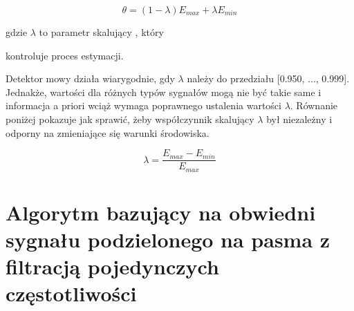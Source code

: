 \documentclass[eng,printmode]{mgr}
\begin{document}
  \begin{equation}
	  \theta = (1-\lambda)E_{max} + \lambda E_{min}
  \end{equation}
  
  \hspace{8cm}gdzie $\lambda$ to parametr skalujący , który 
  
  \hspace{8cm}kontroluje proces estymacji.
  
  Detektor mowy działa wiarygodnie, gdy $\lambda$ należy do przedziału [0.950, ..., 0.999]. Jednakże, wartości dla różnych typów sygnałów mogą nie być takie same i informacja a priori wciąż wymaga poprawnego ustalenia wartości $\lambda$. Równanie poniżej pokazuje jak sprawić, żeby współczynnik skalujący $\lambda$ był niezależny i odporny na zmieniające się warunki środowiska.
  
  \begin{equation}
  	\lambda = \frac{E_{max}-E_{min}}{E_{max}}
  \end{equation}
  
\newpage
 \section{Algorytm bazujący na obwiedni sygnału podzielonego na pasma z filtracją pojedynczych częstotliwości \cite{SFFAlgorithm}}
 
\end{document}
